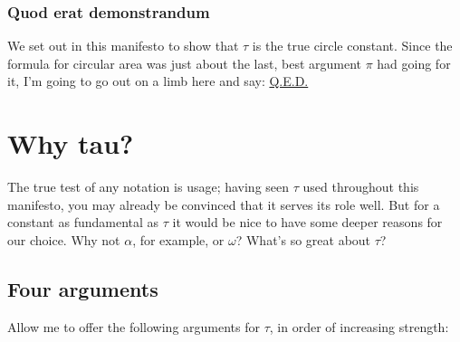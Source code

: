 \documentclass{article}
\begin{document}
    \subsubsection{Quod erat demonstrandum} %
    \label{sec:quod_erat_demonstrandum}
    

We set out in this manifesto to show that $\tau$ is the true circle constant. Since the formula for circular area was just about the last, best argument $\pi$ had going for it, I'm going to go out on a limb here and say: \href{http://en.wikipedia.org/wiki/Q.E.D.}{Q.E.D.}


\section{Why tau?} %
\label{sec:why_tau}

The true test of any notation is usage; having seen $\tau$ used throughout this manifesto, you may already be convinced that it serves its role well. But for a constant as fundamental as $\tau$ it would be nice to have some deeper reasons for our choice. Why not $\alpha$, for example, or $\omega$? What's so great about $\tau$?

  \subsection{Four arguments} %

Allow me to offer the following arguments for $\tau$, in order of increasing strength:
\end{document}
